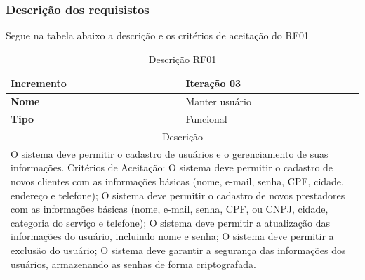 \begin{table}[htb]
\begin{tabular}{|l|p{8cm}|p{3cm}|}
	\end{tabular}
\end{table}


\subsubsection{ Descrição dos requisistos}
\clearpage
Segue na tabela abaixo a descrição e os critérios de aceitação do RF01
\begin{table}[htb]
	\centering
	\caption{\label{Formatação do texto.}Descrição RF01}	
	\begin{tabular}{|l|p{11cm}|}
		\hline
		\textbf{Incremento}    & Iteração 03\\ \hline
		\textbf{Nome}    & Manter usuário\\ \hline
		\textbf{Tipo}    & Funcional\\ \hline
		\multicolumn{2}{|c|}{Descrição}\\ \hline
		\multicolumn{2}{|p{12cm}|}{
			O sistema deve permitir o cadastro de usuários e o gerenciamento de suas informações. \newline
			\newline Critérios de Aceitação: \newline
			O sistema deve permitir o cadastro de novos clientes com as informações básicas (nome, e-mail, senha, CPF, cidade, endereço e telefone); \newline
			\newline O sistema deve permitir o cadastro de novos prestadores com as informações básicas (nome, e-mail, senha, CPF, ou CNPJ, cidade, categoria do serviço e telefone); \newline
			\newline O sistema deve permitir a atualização das informações do usuário, incluindo nome e senha; \newline
			\newline O sistema deve permitir a exclusão do usuário; \newline
			O sistema deve garantir a segurança das informações dos usuários, armazenando as senhas de forma criptografada.
			} \\ \hline
	\end{tabular}
\end{table}

